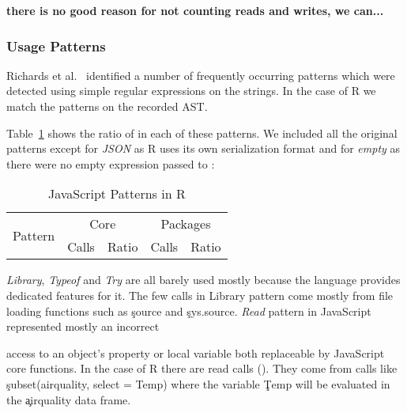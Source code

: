 \documentclass[USenglish,cleveref, autoref, thm-restate]{lipics-v2019}
\begin{document}
{\bf there is no good reason for not counting reads and writes, we can...}





\subsubsection{Usage Patterns}

Richards et al.~\cite{ecoop11} identified a number of frequently occurring \eval
patterns which were detected using simple regular expressions on the \eval
strings. In the case of R we match the patterns on the recorded AST.

Table~\ref{table:js-pattens-in-r} shows the ratio of \eval in each of these
patterns. We included all the original patterns except for \emph{JSON} as R uses
its own serialization format and for \emph{empty} as there were no empty expression
passed to \eval:

\begin{table}[ht]%
  \centering
\begin{tabular}{r|r|r|r|r}\hline
\multirow{2}{*}{Pattern} & \multicolumn{2}{c|}{Core} & \multicolumn{2}{c}{Packages} \\
                         & Calls & Ratio            & Calls & Ratio \\\hline

\end{tabular}
\caption{JavaScript \eval Patterns in R}
\label{table:js-pattens-in-r}
\end{table}


\noindent \emph{Library}, \emph{Typeof} and \emph{Try} are all barely used
mostly because the language provides dedicated features for it. The few calls in
Library pattern come mostly from file loading functions such as \c{source} and
\c{sys.source}.
%
\noindent \emph{Read} pattern in JavaScript represented mostly an incorrect

access to an object's property or local variable both replaceable by
JavaScript core functions. In the case of R there are \PatternReadRnd read
\eval calls (\PatternReadRatio). They come from calls like
\c{subset(airquality, select = Temp)} where the variable \c{Temp} will be
evaluated in the \c{airquality} data frame.
\end{document}
